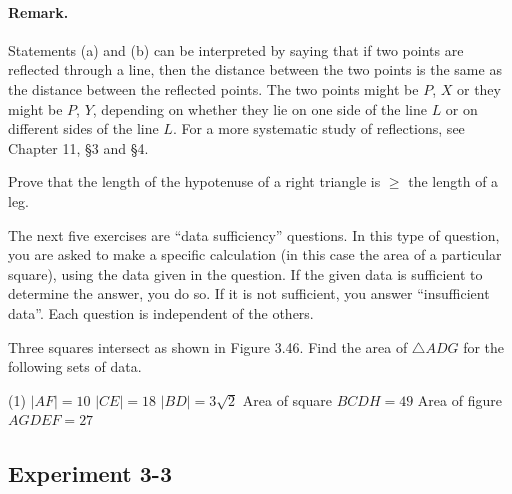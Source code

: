 \documentclass[12pt]{book} %
\begin{document}
\begin{ExerciseList}

\paragraph{Remark.}
Statements (a) and (b) can be interpreted by saying that if two points are reflected through a line, then the distance between the two points is the same as the distance between the reflected points. The two points might be $P$, $X$ or they might be $P$, $Y$, depending on whether they lie on one side of the line $L$ or on different sides of the line $L$. For a more systematic study of reflections, see Chapter 11, \S 3 and \S 4.

\Exercise Prove that the length of the hypotenuse of a right triangle is $\ge$ the length of a leg.

\Exercise The next five exercises are ``data sufficiency'' questions. In this type of question, you are asked to make a specific calculation (in this case the area of a particular square), using the data given in the question. If the given data is sufficient to determine the answer, you do so. If it is not sufficient, you answer ``insufficient data''. Each question is independent of the others.

Three squares intersect as shown in Figure 3.46. Find the area of $\triangle ADG$ for the following sets of data.


\begin{tasks}(1)
\task[(a)] $|AF|=10$
\task[(b)] $|CE|=18$
\task[(c)] $|BD|=3\sqrt{2}$
\task[(d)] Area of square $BCDH=49$
\task[(e)] Area of figure $AGDEF=27$
\end{tasks}
\end{ExerciseList}

\subsection*{Experiment 3-3}
\end{document}
